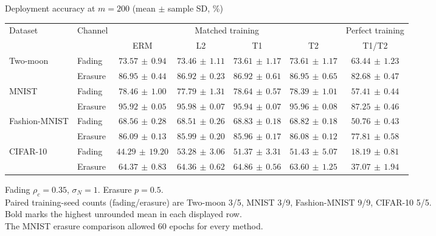 \documentclass[border=4pt]{standalone}
\begin{document}
\begin{minipage}{7.8in}
\centering
Deployment accuracy at $m=200$ (mean $\pm$ sample SD, \%)\\[4pt]
\begin{tabular*}{\linewidth}{@{\extracolsep{\fill}}llccccc@{}}
\toprule
\multirow{2}{*}{Dataset} & \multirow{2}{*}{Channel} & \multicolumn{4}{c}{Matched training} & Perfect training \\
\cmidrule(lr){3-6}\cmidrule(l){7-7}
 & & ERM & L2 & T1 & T2 & T1/T2 \\
\midrule
\multirow{2}{*}{Two-moon} & Fading & $73.57\,\pm\,0.94$ & $73.46\,\pm\,1.11$ & $73.61\,\pm\,1.17$ & $\mathbf{73.61}\,\pm\,1.17$ & $63.44\,\pm\,1.23$ \\
 & Erasure & $86.95\,\pm\,0.44$ & $86.92\,\pm\,0.23$ & $86.92\,\pm\,0.61$ & $\mathbf{86.95}\,\pm\,0.65$ & $82.68\,\pm\,0.47$ \\
\midrule[0.25pt]
\multirow{2}{*}{MNIST} & Fading & $78.46\,\pm\,1.00$ & $77.79\,\pm\,1.31$ & $\mathbf{78.64}\,\pm\,0.57$ & $78.39\,\pm\,1.01$ & $57.41\,\pm\,0.44$ \\
 & Erasure & $95.92\,\pm\,0.05$ & $\mathbf{95.98}\,\pm\,0.07$ & $95.94\,\pm\,0.07$ & $95.96\,\pm\,0.08$ & $87.25\,\pm\,0.46$ \\
\midrule[0.25pt]
\multirow{2}{*}{Fashion-MNIST} & Fading & $68.56\,\pm\,0.28$ & $68.51\,\pm\,0.26$ & $\mathbf{68.83}\,\pm\,0.18$ & $68.82\,\pm\,0.18$ & $50.76\,\pm\,0.43$ \\
 & Erasure & $\mathbf{86.09}\,\pm\,0.13$ & $85.99\,\pm\,0.20$ & $85.96\,\pm\,0.17$ & $86.08\,\pm\,0.12$ & $77.81\,\pm\,0.58$ \\
\midrule[0.25pt]
\multirow{2}{*}{CIFAR-10} & Fading & $44.29\,\pm\,19.20$ & $\mathbf{53.28}\,\pm\,3.06$ & $51.37\,\pm\,3.31$ & $51.43\,\pm\,5.07$ & $18.19\,\pm\,0.81$ \\
 & Erasure & $64.37\,\pm\,0.83$ & $64.36\,\pm\,0.62$ & $\mathbf{64.86}\,\pm\,0.56$ & $63.60\,\pm\,1.25$ & $37.07\,\pm\,1.94$ \\
\bottomrule
\end{tabular*}
\par\smallskip\raggedright\footnotesize
Fading $\rho_c=0.35$, $\sigma_N=1$. Erasure $p=0.5$.\\
Paired training-seed counts (fading/erasure) are Two-moon 3/5, MNIST 3/9, Fashion-MNIST 9/9, CIFAR-10 5/5.\\
Bold marks the highest unrounded mean in each displayed row.\\
The MNIST erasure comparison allowed 60 epochs for every method.
\end{minipage}
\end{document}
